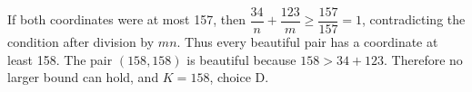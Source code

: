 If both coordinates were at most 157, then $\dfrac{34}{n}+\dfrac{123}{m}\ge\dfrac{157}{157}=1$, contradicting the condition after division by $mn$. Thus every beautiful pair has a coordinate at least 158. The pair $(158,158)$ is beautiful because $158>34+123$. Therefore no larger bound can hold, and $\boxed{K=158}$, choice D.
